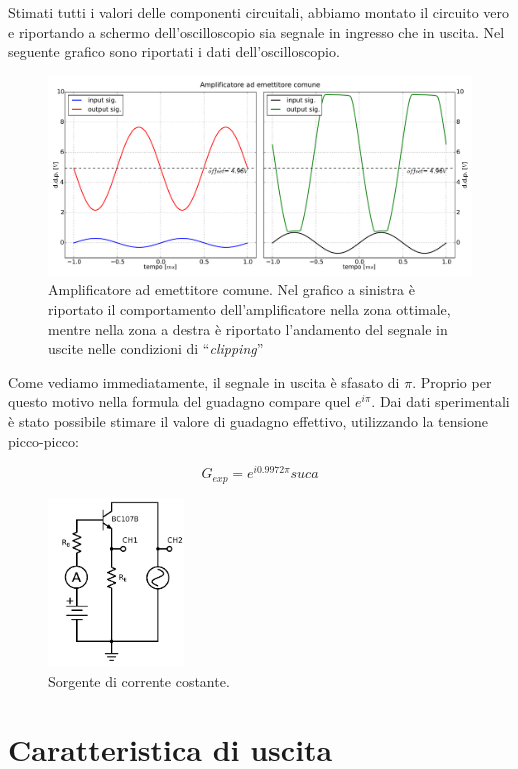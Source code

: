 Stimati tutti i valori delle componenti circuitali, abbiamo montato il circuito vero e riportando a schermo dell'oscilloscopio sia segnale in ingresso che in uscita.
Nel seguente grafico sono riportati i dati dell'oscilloscopio.

\begin{figure}[H]
\centering
	\includegraphics[scale=0.45]{amp.pdf}
	\caption{Amplificatore ad emettitore comune. Nel grafico a sinistra è riportato il comportamento dell'amplificatore nella zona ottimale, mentre nella zona a destra è riportato l'andamento del segnale in uscite nelle condizioni di ``\emph{clipping}''}
	\label{fig:amp}
\end{figure}

Come vediamo immediatamente, il segnale in uscita è sfasato di $\pi$.
Proprio per questo motivo nella formula del guadagno compare quel $e^{i\pi}$.
Dai dati sperimentali è stato possibile stimare il valore di guadagno effettivo, utilizzando la tensione picco-picco:

$$G_{exp}=e^{i 0.9972 \pi} suca$$

\begin{figure}
	\includegraphics[width=36mm]{cc3.pdf}
	\caption{Sorgente di corrente costante.}
	\label{fig:cc3}
\end{figure}

\section{Caratteristica di uscita}

